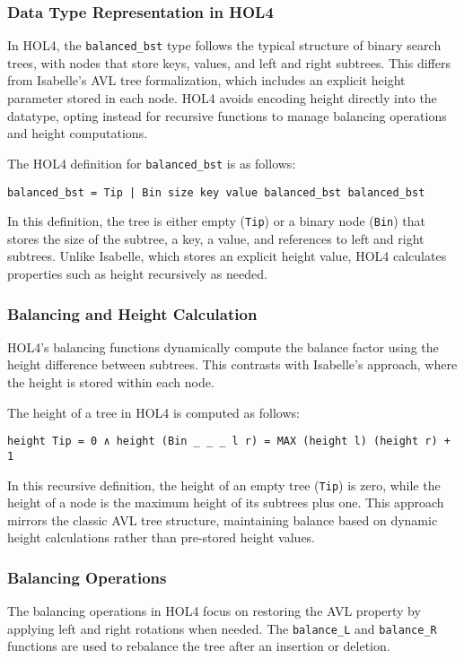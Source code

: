 \documentclass[12pt]{article}
\begin{document}
\subsubsection{Data Type Representation in HOL4}
In HOL4, the \texttt{balanced\_bst} type follows the typical structure of binary search trees, with nodes that store keys, values, and left and right subtrees. This differs from Isabelle's AVL tree formalization, which includes an explicit height parameter stored in each node. HOL4 avoids encoding height directly into the datatype, opting instead for recursive functions to manage balancing operations and height computations.

The HOL4 definition for \texttt{balanced\_bst} is as follows:

\begin{verbatim}
balanced_bst = Tip | Bin size key value balanced_bst balanced_bst
\end{verbatim}

In this definition, the tree is either empty (\texttt{Tip}) or a binary node (\texttt{Bin}) that stores the size of the subtree, a key, a value, and references to left and right subtrees. Unlike Isabelle, which stores an explicit height value, HOL4 calculates properties such as height recursively as needed.

\subsubsection{Balancing and Height Calculation}
HOL4’s balancing functions dynamically compute the balance factor using the height difference between subtrees. This contrasts with Isabelle’s approach, where the height is stored within each node.

The height of a tree in HOL4 is computed as follows:

\begin{verbatim}
height Tip = 0 ∧ height (Bin _ _ _ l r) = MAX (height l) (height r) + 1
\end{verbatim}

In this recursive definition, the height of an empty tree (\texttt{Tip}) is zero, while the height of a node is the maximum height of its subtrees plus one. This approach mirrors the classic AVL tree structure, maintaining balance based on dynamic height calculations rather than pre-stored height values.

\subsubsection{Balancing Operations}
The balancing operations in HOL4 focus on restoring the AVL property by applying left and right rotations when needed. The \texttt{balance\_L} and \texttt{balance\_R} functions are used to rebalance the tree after an insertion or deletion.
\end{document}
